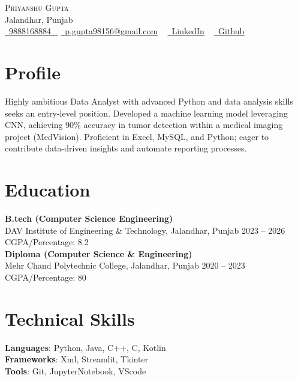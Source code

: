 \documentclass[letterpaper,11pt]{article}
\begin{document}
\begin{center}
    {\Huge \scshape Priyanshu Gupta} \\ \vspace{1pt}
    Jalandhar,  Punjab \\ \vspace{3pt}
    \small 
    \small \href{9888168884}{ \raisebox{-0.1\height}\faPhone\ \underline{9888168884} ~} 
    \href{p.gupta98156@gmail.com}{\raisebox{-0.2\height}\faEnvelope\  \underline{p.gupta98156@gmail.com}} ~
    \href{https://www.linkedin.com/in/priyanshu-gupta18/}{\raisebox{-0.2\height}\faLinkedinSquare\ \underline{LinkedIn}}  ~
    \href{https://github.com/Priyanshu98156}{\raisebox{-0.2\height}\faGithub\ \underline{Github}} ~
\end{center}

\section{Profile}
Highly ambitious Data Analyst with advanced Python and data analysis skills seeks an entry-level position.  Developed a machine learning model leveraging CNN, achieving 90\% accuracy in tumor detection within a medical imaging project (MedVision). Proficient in Excel, MySQL, and Python; eager to contribute data-driven insights and automate reporting processes.\\ 


\section*{Education}
\textbf{B.tech (Computer Science Engineering)} \\[2pt]
DAV Institute of Engineering \& Technology, Jalandhar, Punjab \hfill 2023 -- 2026 \\[2pt]
CGPA/Percentage: 8.2 \\[6pt]
\textbf{Diploma (Computer Science \& Engineering)} \\[2pt]
Mehr Chand Polytechnic College, Jalandhar, Punjab \hfill 2020 -- 2023 \\[2pt]
CGPA/Percentage: 80 \\[6pt]


\section*{Technical Skills}
\textbf{Languages}: Python, Java, C++, C, Kotlin \\[4pt]
\textbf{Frameworks}: Xml, Streamlit, Tkinter \\[4pt]
\textbf{Tools}: Git, JupyterNotebook, VScode \\[4pt]
\end{document}
